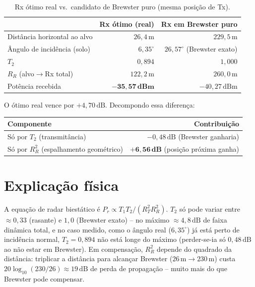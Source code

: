 \documentclass[12pt,a4paper,oneside]{book}
\theoremstyle{definition}
\theoremstyle{remark}
\newcommand{\RT}{R_T}
\newcommand{\RR}{R_R}
\newcommand{\Prcv}{P_r}
\begin{document}
\begin{table}[H]
\centering
\caption{Rx ótimo real vs.\ candidato de Brewster puro (mesma posição de Tx).}
\label{tab:brewster_vs_rango}
\begin{tabular}{lrr}
\toprule
& Rx ótimo (real) & Rx em Brewster puro \\
\midrule
Distância horizontal ao alvo & $26{,}4\,\mathrm{m}$ & $229{,}5\,\mathrm{m}$ \\
Ângulo de incidência (solo) & $6{,}35^\circ$ & $26{,}57^\circ$ (Brewster exato) \\
$T_2$ & $0{,}894$ & $1{,}000$ \\
$R_R$ (alvo$\to$Rx total) & $122{,}2\,\mathrm{m}$ & $260{,}0\,\mathrm{m}$ \\
Potência recebida & $\mathbf{-35{,}57\,dBm}$ & $-40{,}27\,\mathrm{dBm}$ \\
\bottomrule
\end{tabular}
\end{table}

O ótimo real vence por $+4{,}70\,\mathrm{dB}$. Decompondo essa diferença:

\begin{table}[H]
\centering
\begin{tabular}{lr}
\toprule
Componente & Contribuição \\
\midrule
Só por $T_2$ (transmitância) & $-0{,}48\,\mathrm{dB}$ (Brewster ganharia) \\
Só por $R_R^2$ (espalhamento geométrico) & $\mathbf{+6{,}56\,dB}$ (posição próxima ganha) \\
\bottomrule
\end{tabular}
\end{table}

\section{Explicação física}

A equação de radar biestático é $\Prcv\propto T_1T_2/(\RT^2\RR^2)$. $T_2$
só pode variar entre $\approx0{,}33$ (rasante) e $1{,}0$ (Brewster exato)
-- no máximo $\approx4{,}8\,\mathrm{dB}$ de faixa dinâmica total, e no caso
medido, como o ângulo real ($6{,}35^\circ$) já está perto de incidência
normal, $T_2=0{,}894$ não está longe do máximo (perder-se-ia só
$0{,}48\,\mathrm{dB}$ ao não estar em Brewster). Em compensação, $\RR^2$
depende do quadrado da distância: triplicar a distância para alcançar
Brewster ($26\,\mathrm{m}\to230\,\mathrm{m}$) custa
$20\log_{10}(230/26)\approx19\,\mathrm{dB}$ de perda de propagação --
muito mais do que Brewster pode compensar.
\end{document}
